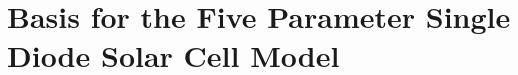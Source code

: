 \chapter{Basis for the Five Parameter Single Diode Solar Cell Model}\label{appendix:five_parameter_solar_cell}
